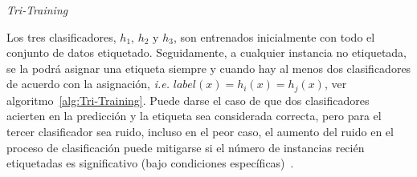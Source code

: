 \begin{algorithm}[H]
  	\BlankLine
  	
	\caption{\textit{Tri-Training}}\label{alg:Tri-Training}
\end{algorithm}

Los tres clasificadores, $h_1\text{, } h_2 \text{ y } h_3$, son entrenados inicialmente con todo el conjunto de datos etiquetado. Seguidamente, a cualquier instancia no etiquetada, se la podrá asignar una etiqueta siempre y cuando hay al menos dos clasificadores de acuerdo con la asignación, \textit{i.e.} $label(x) = h_i(x) =  h_j(x)$, ver~ algoritmo~\ref{alg:Tri-Training}. Puede darse el caso de que dos clasificadores acierten en la predicción y la etiqueta sea considerada correcta, pero para el tercer clasificador sea ruido, incluso en el peor caso, el aumento del ruido en el proceso de clasificación puede mitigarse si el número de instancias recién etiquetadas es significativo (bajo condiciones específicas)~\cite{zhou2005tri}.

